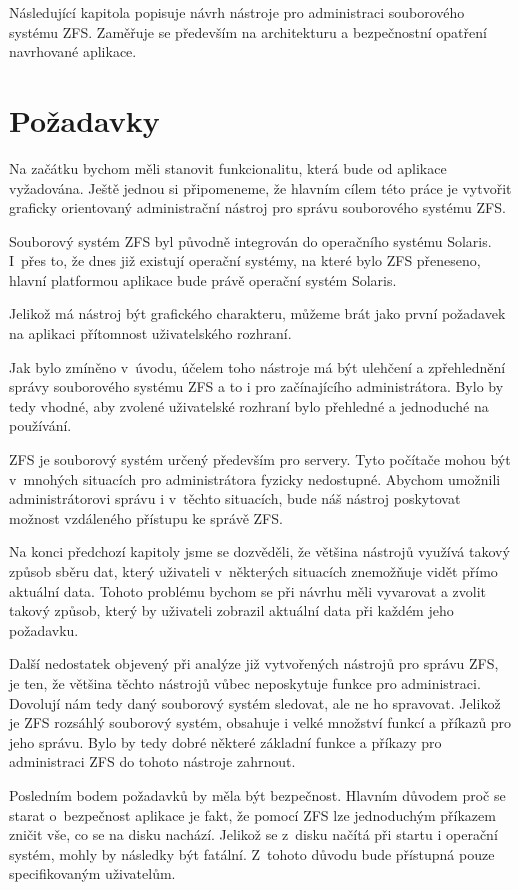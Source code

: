 Následující kapitola popisuje návrh nástroje pro administraci souborového systému ZFS. Zaměřuje se především na architekturu a bezpečnostní opatření navrhované aplikace.
\section{Požadavky}
Na začátku bychom měli stanovit funkcionalitu, která bude od aplikace vyžadována. Ještě jednou si připomeneme, že hlavním cílem této práce je vytvořit graficky orientovaný administrační nástroj pro správu souborového systému ZFS.

Souborový systém ZFS byl původně integrován do operačního systému Solaris. I~přes to, že dnes již existují operační systémy, na které bylo ZFS přeneseno, hlavní platformou aplikace bude právě operační systém Solaris.

Jelikož má nástroj být grafického charakteru, můžeme brát jako první požadavek na aplikaci přítomnost uživatelského rozhraní.

Jak bylo zmíněno v~úvodu, účelem toho nástroje má být ulehčení a zpřehlednění správy souborového systému ZFS a to i pro začínajícího administrátora. Bylo by tedy vhodné, aby zvolené uživatelské rozhraní bylo přehledné a jednoduché na používání.

ZFS je souborový systém určený především pro servery. Tyto počítače mohou být v~mnohých situacích pro administrátora fyzicky nedostupné. Abychom umožnili administrátorovi správu i v~těchto situacích, bude náš nástroj poskytovat možnost vzdáleného přístupu ke správě ZFS.

Na konci předchozí kapitoly jsme se dozvěděli, že většina nástrojů využívá takový způsob sběru dat, který uživateli v~některých situacích znemožňuje vidět přímo aktuální data. Tohoto problému bychom se při návrhu měli vyvarovat a zvolit takový způsob, který by uživateli zobrazil aktuální data při každém jeho požadavku.

Další nedostatek objevený při analýze již vytvořených nástrojů pro správu ZFS, je ten, že většina těchto nástrojů vůbec neposkytuje funkce pro administraci. Dovolují nám tedy daný souborový systém sledovat, ale ne ho spravovat. Jelikož je ZFS rozsáhlý souborový systém, obsahuje i velké množství funkcí a příkazů pro jeho správu. Bylo by tedy dobré některé základní funkce a příkazy pro administraci ZFS do tohoto nástroje zahrnout.

Posledním bodem požadavků by měla být bezpečnost. Hlavním důvodem proč se starat o~bezpečnost aplikace je fakt, že pomocí ZFS lze jednoduchým příkazem zničit vše, co se na disku nachází. Jelikož se z~disku načítá při startu i operační systém, mohly by následky být fatální. Z~tohoto důvodu bude přístupná pouze specifikovaným uživatelům.

